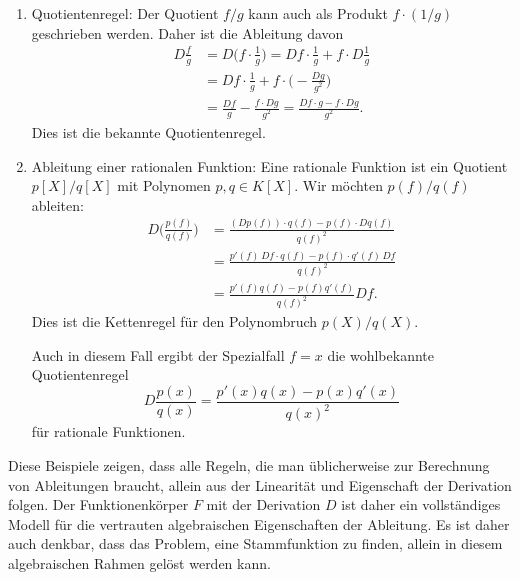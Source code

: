 \begin{enumerate}
Wir möchten die Ableitung von $Dp(f)$ berechnen.
Nach der Potenzregel gilt
\begin{align*}
Dp(f)
&=
D(p_0+p_1f + p_2f^2 + \ldots + p_{n-1}f^{n-1}+p_nf^n)
\\
&=
p_1Df + p_2\cdot 2f Df + \ldots p_{n-1}(n-1)f^{n-2}Df + p_nnf^{n-1}Df
\\
&=
\bigl(
p_1 + 2p_2 f + 3p_3f^2 + \ldots + p_{n-1}(n-1)f^{n-2} + p_nnf^{n-1}
\bigr)
Df.
\intertext{Das Polynom auf der rechten Seite ist auch bekannt als
das abgeleitete Polynom $p'(X)$, so dass man}
&= p'(f)\, Df
\end{align*}
schreiben kann.
Dies ist formal die Kettenregel für Polynome.

Der Spezialfall $f=x$ liefert die Ableitungsformel
\[
Dp(x) = p'(x)\cdot Dx = p'(x),
\]
d.~h.~die für das abgeleitet Polynom eingeführte Notation ist im 
Fall $X=x$ identisch mit der Ableitung mit der Deriviation $D$.
%
%
\item
Quotientenregel:
Der Quotient $f/g$ kann auch als Produkt $f\cdot (1/g)$ geschrieben
werden.
Daher ist die Ableitung davon
\begin{align*}
D\frac{f}{g}
&=
D\biggl(f\cdot\frac1g\biggr)
=
Df\cdot\frac1g + f\cdot D\frac1g
\\
&=
Df\cdot\frac1g + f\cdot \biggl(-\frac{Dg}{g^2}\biggr)
\\
&=
\frac{Df}{g} - \frac{f\cdot Dg}{g^2}
=
\frac{Df\cdot g - f\cdot Dg}{g^2}.
\end{align*}
Dies ist die bekannte Quotientenregel.
\item Ableitung einer rationalen Funktion:
Eine rationale Funktion ist ein Quotient $p[X]/q[X]$ mit
Polynomen $p,q\in K[X]$.
Wir möchten $p(f)/q(f)$ ableiten:
\begin{align*}
D\biggl(\frac{p(f)}{q(f)}\biggr)
&=
\frac{
(Dp(f))\cdot q(f) - p(f)\cdot Dq(f)
}{
q(f)^2
}
\\
&=
\frac{p'(f)\,Df\cdot q(f)-p(f)\cdot q'(f)\, Df}{q(f)^2}
\\
&=
\frac{p'(f)q(f)-p(f) q'(f)}{q(f)^2}
Df.
\end{align*}
Dies ist die Kettenregel für den Polynombruch $p(X)/q(X)$.

Auch in diesem Fall ergibt der Spezialfall $f=x$ die wohlbekannte
Quotientenregel
\[
D\frac{p(x)}{q(x)}
=
\frac{p'(x)q(x)-p(x)q'(x)}{q(x)^2}
\]
für rationale Funktionen.
\end{enumerate}

Diese Beispiele zeigen, dass alle Regeln, die man üblicherweise
zur Berechnung von Ableitungen braucht, allein aus der Linearität
und Eigenschaft der Derivation folgen.
Der Funktionenkörper $F$ mit der Derivation $D$ ist daher ein
vollständiges Modell für die vertrauten algebraischen Eigenschaften
der Ableitung.
Es ist daher auch denkbar, dass das Problem, eine Stammfunktion
zu finden, allein in diesem algebraischen Rahmen gelöst werden
kann.

